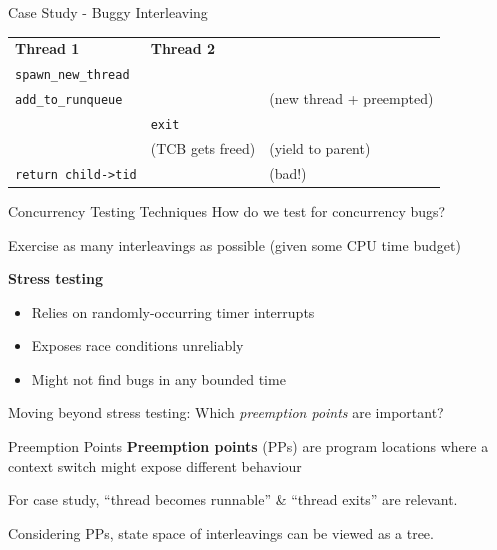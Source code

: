 \documentclass[xcolor=dvipsnames]{beamer}
\begin{document}
\begin{frame}{Case Study - Buggy Interleaving}
	\begin{tabular}{|l|l|l}
		\cline{1-2}
		{\bf Thread 1} & {\bf Thread 2} & \\
		\cline{1-2}
		\texttt{spawn\_new\_thread} && \\
		\cline{1-2}
		\texttt{add\_to\_runqueue} && (new thread + preempted) \\
		\cline{1-2}
		& \texttt{exit} & \\
		\cline{1-2}
		& (TCB gets freed) & (yield to parent) \\
		\cline{1-2}
		\texttt{return child->tid} && (bad!) \\
		\cline{1-2}
	\end{tabular}
\end{frame}


\begin{frame}{Concurrency Testing Techniques}
	How do we test for concurrency bugs?
	\linegap

	Exercise as many interleavings as possible (given some CPU time budget)
	\linegap

	\textbf{Stress testing}
	\begin{itemize}
		\item Relies on randomly-occurring timer interrupts %
		\item Exposes race conditions unreliably
		\item Might not find bugs in any bounded time
	\end{itemize}
	\pause
	\linegap

	Moving beyond stress testing: Which {\em preemption points} are important?
\end{frame}

\begin{frame}{Preemption Points}
	\textbf{Preemption points} (PPs) are program locations where a context switch might expose different behaviour
	\linegap

	For case study, ``thread becomes runnable'' \& ``thread exits'' are relevant.
	\linegap

	Considering PPs, state space of interleavings can be viewed as a tree.
\end{frame}
\end{document}
